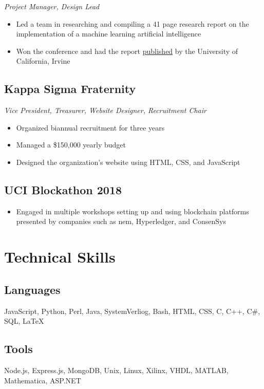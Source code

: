\documentclass[10pt]{article}
\begin{document}
\noindent\textit{Project Manager, Design Lead}

\begin{itemize}
	\setlength\itemsep{0em}
	\item Led a team in researching and compiling a 41 page research report on the implementation of a machine learning artificial intelligence
	\item Won the conference and had the report \href{https://escholarship.org/uc/item/3hm5q8b8}{published} by the University of California, Irvine
\end{itemize}

\subsection{Kappa Sigma Fraternity}

\noindent\textit{Vice President, Treasurer, Website Designer, Recruitment Chair}

\begin{itemize}
	\setlength\itemsep{0em}
	\item Organized biannual recruitment for three years
	\item Managed a \$150,000 yearly budget
	\item Designed the organization's website using HTML, CSS, and JavaScript
\end{itemize}

\subsection{UCI Blockathon 2018}

\begin{itemize}
	\setlength\itemsep{0em}
	\item Engaged in multiple workshops setting up and using blockchain platforms presented by companies such as nem, 
Hyperledger, and ConsenSys
\end{itemize}

\section{Technical Skills}

\subsection{Languages}

JavaScript, Python, Perl, Java, SystemVerliog, Bash, HTML, CSS, C, C++, C\#, SQL, \LaTeX

\subsection{Tools}

Node.js, Express.js, MongoDB, Unix, Linux, Xilinx, VHDL, MATLAB, Mathematica, ASP.NET
\end{document}
